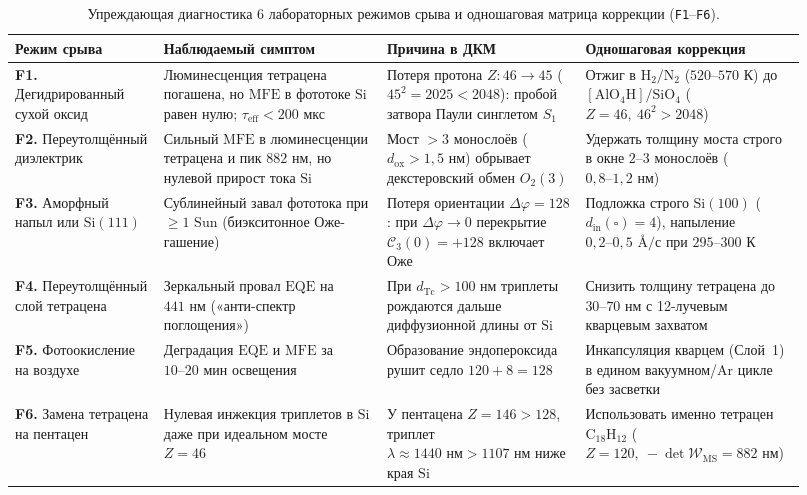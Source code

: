 \begin{table}[htbp]
\centering
\caption{Упреждающая диагностика 6 лабораторных режимов срыва и одношаговая матрица коррекции (\texttt{F1}--\texttt{F6}).}
\label{tab:lab-troubleshooting-f1-f6}
\footnotesize
\begin{tabular}{@{}p{0.18\linewidth}p{0.27\linewidth}p{0.24\linewidth}p{0.23\linewidth}@{}}
\toprule
\textbf{Режим срыва} & \textbf{Наблюдаемый симптом} & \textbf{Причина в ДКМ} & \textbf{Одношаговая коррекция} \\
\midrule
\textbf{F1.} Дегидрированный сухой оксид & Люминесценция тетрацена погашена, но $\mathrm{MFE}$ в фототоке $\mathrm{Si}$ равен нулю; $\tau_{\mathrm{eff}} < 200\text{ мкс}$ & Потеря протона $Z : 46 \to 45$ ($45^2 = 2025 < 2048$): пробой затвора Паули синглетом $S_1$ & Отжиг в $\mathrm{H_2}/\mathrm{N_2}$ ($520\text{--}570\text{ К}$) до $[\mathrm{AlO_4H}]/\mathrm{SiO_4}$ ($Z=46,\ 46^2>2048$) \\
\addlinespace
\textbf{F2.} Переутолщённый диэлектрик & Сильный $\mathrm{MFE}$ в люминесценции тетрацена и пик $882\text{ нм}$, но нулевой прирост тока $\mathrm{Si}$ & Мост $>3$ монослоёв ($d_{\mathrm{ox}} > 1{,}5\text{ нм}$) обрывает декстеровский обмен $O_2(3)$ & Удержать толщину моста строго в окне $2\text{--}3$ монослоёв ($0{,}8\text{--}1{,}2\text{ нм}$) \\
\addlinespace
\textbf{F3.} Аморфный напыл или $\mathrm{Si}(111)$ & Сублинейный завал фототока при $\ge 1\text{ Sun}$ (биэкситонное Оже-гашение) & Потеря ориентации $\Delta\varphi = 128$: при $\Delta\varphi \to 0$ перекрытие $\mathcal{C}_3(0) = +128$ включает Оже & Подложка строго $\mathrm{Si}(100)$ ($d_{\mathrm{in}}(\square)=4$), напыление $0{,}2\text{--}0{,}5\text{ \AA/с}$ при $295\text{--}300\text{ К}$ \\
\addlinespace
\textbf{F4.} Переутолщённый слой тетрацена & Зеркальный провал $\mathrm{EQE}$ на $441\text{ нм}$ («анти-спектр поглощения») & При $d_{\mathrm{Tc}} > 100\text{ нм}$ триплеты рождаются дальше диффузионной длины от $\mathrm{Si}$ & Снизить толщину тетрацена до $30\text{--}70\text{ нм}$ с 12-лучевым кварцевым захватом \\
\addlinespace
\textbf{F5.} Фотоокисление на воздухе & Деградация $\mathrm{EQE}$ и $\mathrm{MFE}$ за $10\text{--}20\text{ мин}$ освещения & Образование эндопероксида рушит седло $120 + 8 = 128$ & Инкапсуляция кварцем (Слой~1) в едином вакуумном/$\mathrm{Ar}$ цикле без засветки \\
\addlinespace
\textbf{F6.} Замена тетрацена на пентацен & Нулевая инжекция триплетов в $\mathrm{Si}$ даже при идеальном мосте $Z=46$ & У пентацена $Z=146>128$, триплет $\lambda\approx 1440\text{ нм} > 1107\text{ нм}$ ниже края $\mathrm{Si}$ & Использовать именно тетрацен $\mathrm{C_{18}H_{12}}$ ($Z=120,\ -\det\mathcal{W}_{\mathrm{MS}}=882\text{ нм}$) \\
\bottomrule
\end{tabular}
\end{table}

